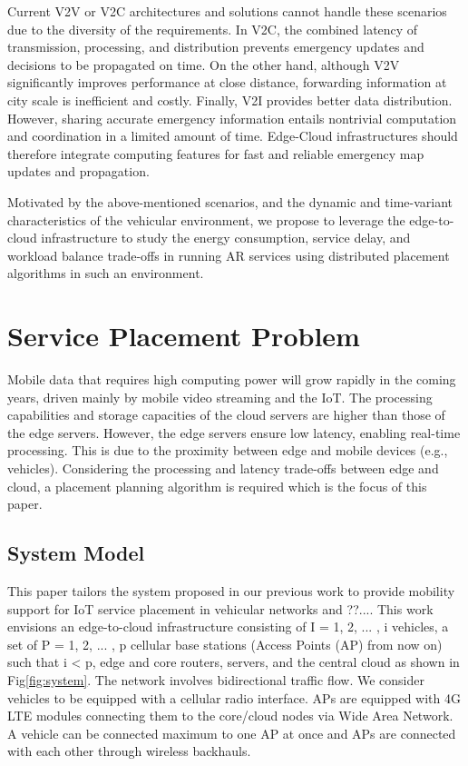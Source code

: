 \documentclass[twocolumn]{article}
\begin{document}
\par Current V2V or V2C architectures and solutions cannot handle these scenarios due to the diversity of the requirements.
In V2C, the combined latency of transmission, processing, and distribution prevents emergency updates and decisions to be propagated on time. On the other hand, although V2V significantly improves performance at close distance, forwarding information at city scale is inefficient and costly. Finally, V2I provides better data distribution. However, sharing accurate emergency information entails nontrivial computation and coordination in a limited amount of time. Edge-Cloud infrastructures should therefore integrate computing features for fast and reliable emergency map updates and propagation.

\par Motivated by the above-mentioned scenarios, and the dynamic and time-variant characteristics of the vehicular environment, we propose to leverage the edge-to-cloud infrastructure to study the energy consumption, service delay, and workload balance trade-offs in running AR services using distributed placement algorithms in such an environment.

\section{Service Placement Problem}
\par Mobile data that requires high computing power will grow rapidly in the coming years, driven mainly by mobile video streaming and the IoT. The processing capabilities and storage capacities of the cloud servers are higher than those of the edge servers. However, the edge servers ensure low latency, enabling real-time processing. This is due to the proximity between edge and mobile devices (e.g., vehicles). Considering the processing and latency trade-offs between edge and cloud, a placement planning algorithm is required which is the focus of this paper. 

\subsection{System Model}
\par This paper tailors the system proposed in our previous work\cite{nezami2021decentralized} to provide mobility support for IoT service placement in vehicular networks and ??.... This work envisions an edge-to-cloud infrastructure consisting of I = {1, 2, ... , i} vehicles, a set of P = {1, 2, ... , p} cellular base stations (Access Points (AP) from now on) such that i < p, edge and core routers, servers, and the central cloud as shown in Fig\ref{fig:system}. The network involves bidirectional traffic flow. We consider vehicles to be equipped with a cellular radio interface\cite{malandrino2013content}. APs are equipped with 4G LTE modules connecting them to the core/cloud nodes via Wide Area Network. A vehicle can be connected maximum to one AP at once and APs are connected with each other through wireless backhauls. 
\end{document}

